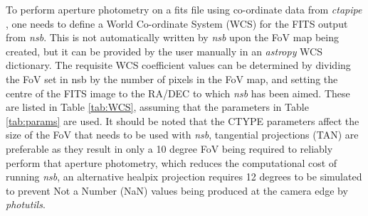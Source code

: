 To perform aperture photometry on a fits file using co-ordinate data from \textit{ctapipe} \cite{ctapipe2}, one needs to define a World Co-ordinate System (WCS) for the FITS output from \textit{nsb}. This is not automatically written by \textit{nsb} upon the FoV map being created, but it can be provided by the user manually in an \textit{astropy} WCS dictionary. The requisite WCS coefficient values can be determined by dividing the FoV set in nsb by the number of pixels in the FoV map, and setting the centre of the FITS image to the RA/DEC to which \textit{nsb} has been aimed. These are listed in Table \ref{tab:WCS}, assuming that the parameters in Table \ref{tab:params} are used. It should be noted that the CTYPE parameters affect the size of the FoV that needs to be used with \textit{nsb}, tangential projections (TAN) are preferable as they result in only a 10 degree FoV being required to reliably perform that aperture photometry, which reduces the computational cost of running \textit{nsb}, an alternative healpix projection requires 12 degrees to be simulated to prevent Not a Number (NaN) values being produced at the camera edge by \textit{photutils}.
\begin{table}[]
    \centering
    \caption{WCS Dictionary Headers and Parameters Recommended for SSTCAM, Reliant on Configuration in Table \ref{tab:params}. Note the CTYPEn projection used affects the nessecary size of the FoV map generated by \textit{nsb}. The rotation parameters CROTA1 and CROTA2 are degenerate in their effect, and are not trivially set.}
    \label{tab:WCS}
\end{table}


